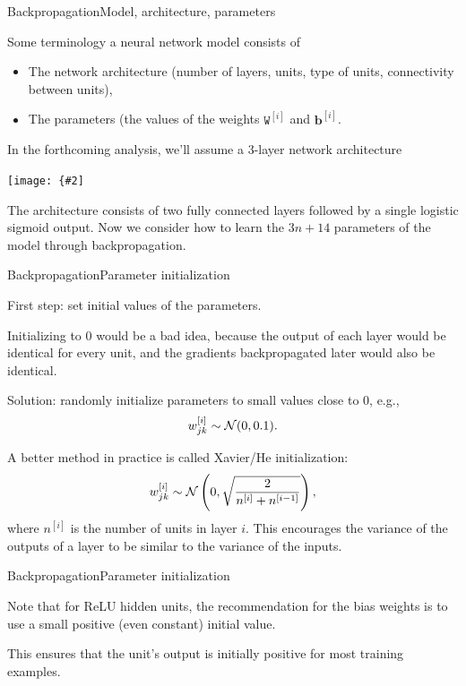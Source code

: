 \documentclass{beamer}
\renewcommand{\vec}[1]{\boldsymbol{#1}}
\newcommand{\mat}[1]{\mathtt{#1}}
\newcommand{\myfig}[3]{\centerline{\texttt{[image: \{\#2]}}}
\begin{document}
\begin{frame}{Backpropagation}{Model, architecture, parameters}

  Some terminology a neural network \alert{model} consists of
  \begin{itemize}
  \item The network \alert{architecture} (number of layers, units, type of units, connectivity between units),
  \item The \alert{parameters} (the values of the weights $\mat{W}^{[i]}$ and
    $\vec{b}^{[i]}$.
  \end{itemize}

  \medskip

  In the forthcoming analysis, we'll assume a 3-layer network architecture

  \myfig{2.5in}{three-layer}{Ng (2017), Deep learning lecture notes for CS 229.}

  The architecture consists of two \alert{fully connected layers}
  followed by a single \alert{logistic sigmoid output}. Now we
  consider how to learn the $3n+14$ parameters of the model through
  backpropagation.

\end{frame}


\begin{frame}{Backpropagation}{Parameter initialization}

  First step: \alert{set initial values of the parameters}.

  \medskip

  Initializing to 0 would be a bad idea, because the output of each layer
  would be identical for every unit, and the gradients backpropagated
  later would also be identical.

  \medskip

  Solution: randomly initialize parameters to small values close to 0,
  e.g., \[ w^{[i]}_{jk} \sim {\cal N}(0,0.1). \]

  A better method in practice is called Xavier/He initialization:
  \[ w^{[i]}_{jk} \sim {\cal N}\left(0,\sqrt{\frac{2}{n^{[i]}+n^{[i-1]}}} \right), \]
  where $n^{[i]}$ is the number of units in layer $i$. This encourages
  the variance of the outputs of a layer to be similar to the variance
  of the inputs.
  
\end{frame}


\begin{frame}{Backpropagation}{Parameter initialization}

  Note that for \alert{ReLU hidden units}, the recommendation for the
  \alert{bias weights} is to use a small \alert{positive} (even
  constant) initial value.

  \medskip

  This ensures that the unit's output is initially positive for most
  training examples.
  
\end{frame}
\end{document}
